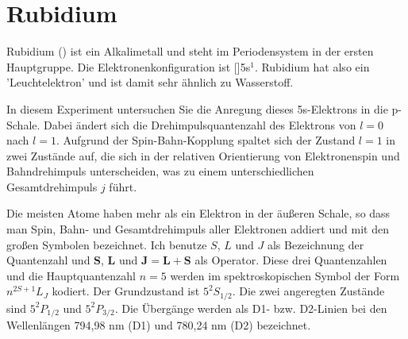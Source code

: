 \section{Rubidium}
	

Rubidium () ist ein Alkalimetall und steht im Periodensystem in der ersten Hauptgruppe. Die Elektronenkonfiguration ist []5s$^1$. Rubidium hat also ein 'Leuchtelektron' und ist damit sehr ähnlich zu  Wasserstoff. 


In diesem Experiment untersuchen Sie die Anregung dieses 5s-Elektrons in die p-Schale. Dabei ändert sich die Drehimpulsquantenzahl des Elektrons von $l=0$ nach $l=1$. Aufgrund der Spin-Bahn-Kopplung spaltet sich der Zustand $l=1$ in zwei Zustände auf, die sich in der relativen Orientierung von Elektronenspin und Bahndrehimpuls unterscheiden, was zu einem unterschiedlichen Gesamtdrehimpuls $j$ führt.

Die meisten Atome haben mehr als ein Elektron in der äußeren Schale, so dass man Spin, Bahn- und Gesamtdrehimpuls aller Elektronen addiert und mit den großen Symbolen bezeichnet. Ich benutze $S$, $L$ und $J$ als Bezeichnung der Quantenzahl und 
$\mathbf{S}$, $\mathbf{L}$ und $\mathbf{J} = \mathbf{L} + \mathbf{S}$ als Operator. Diese drei Quantenzahlen und die Hauptquantenzahl $n=5$ werden im spektroskopischen Symbol der Form $n^{2S+1}L_J$ kodiert. Der Grundzustand ist $5^2S_{1/2}$. Die zwei angeregten Zustände sind $5^2P_{1/2}$ und $5^2P_{3/2}$. Die Übergänge werden als D1- bzw. D2-Linien bei den Wellenlängen 794,98 nm (D1) und 780,24 nm (D2) bezeichnet.

\begin{marginfigure}
	\caption{D1- und D2-Linie von Rubidium.}	
	\label{D-Linie}
\end{marginfigure}

